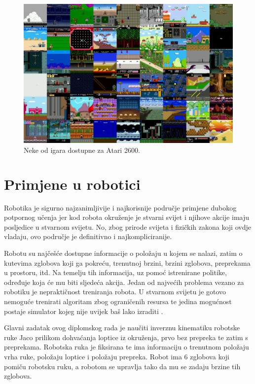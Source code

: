 \documentclass[times,utf8,diplomski]{fer}
\begin{document}
\begin{figure}[ht!]
	\centering
	\includegraphics[width=\columnwidth]{img/atari.png}
	\caption{Neke od igara dostupne za Atari 2600.\protect\footnotemark}
	\label{fig:podjela}
\end{figure}

\section{Primjene u robotici}

Robotika je sigurno najzanimljivije i najkorisnije područje primjene dubokog potpornog učenja jer kod robota okruženje je stvarni svijet i njihove akcije imaju posljedice u stvarnom svijetu. No, zbog prirode svijeta i fizičkih zakona koji ovdje vladaju, ovo područje je definitivno i najkompliciranije.

Robotu su najčešće dostupne informacije o položaju u kojem se nalazi, zatim o kutevima zglobova koji ga pokreću, trenutnoj brzini, brzini zglobova, preprekama u prostoru, itd. Na temelju tih informacija, uz pomoć istrenirane politike, određuje koja će mu biti sljedeća akcija. Jedan od najvećih problema vezano za robotiku je nepraktičnost treniranja robota. U stvarnom svijetu je gotovo nemoguće trenirati algoritam zbog ograničenih resursa te jedina mogućnost postaje simulator kojeg nije uvijek baš lako izraditi  \citep{kalas}.

Glavni zadatak ovog diplomskog rada je naučiti inverznu kinematiku robotske ruke Jaco prilikom dohvaćanja loptice iz okruženja, prvo bez prepreka te zatim s preprekama. Robotska ruka je fiksirana te ima informaciju o trenutnom položaju vrha ruke, položaju loptice i položaju prepreka. Robot ima 6 zglobova koji pomiču robotsku ruku, a robotom se upravlja tako da mu se zadaju brzine tih zglobova.
\end{document}
